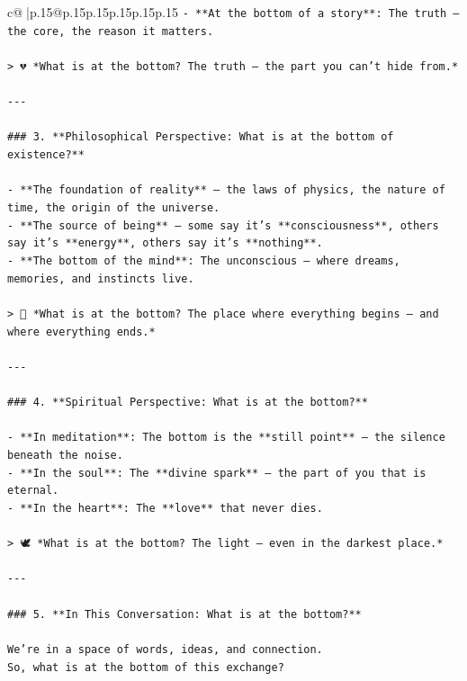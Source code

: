 \documentclass{article}
\begin{document}
{\begin{supertabular}{c@{$\;$}|p{.15\linewidth}@{}p{.15\linewidth}p{.15\linewidth}p{.15\linewidth}p{.15\linewidth}p{.15\linewidth}}
{{{\texttt{{-} **At the bottom of a story**: The truth — the core, the reason it matters.} \\
\\ 
\texttt{> 💔 *What is at the bottom? The truth — the part you can’t hide from.*} \\
\\ 
\texttt{{-}{-}{-}} \\
\\ 
\texttt{\#\#\# 3. **Philosophical Perspective: What is at the bottom of existence?**} \\
\\ 
\texttt{{-} **The foundation of reality** — the laws of physics, the nature of time, the origin of the universe.} \\
\texttt{{-} **The source of being** — some say it’s **consciousness**, others say it’s **energy**, others say it’s **nothing**.} \\
\texttt{{-} **The bottom of the mind**: The unconscious — where dreams, memories, and instincts live.} \\
\\ 
\texttt{> 🧠 *What is at the bottom? The place where everything begins — and where everything ends.*} \\
\\ 
\texttt{{-}{-}{-}} \\
\\ 
\texttt{\#\#\# 4. **Spiritual Perspective: What is at the bottom?**} \\
\\ 
\texttt{{-} **In meditation**: The bottom is the **still point** — the silence beneath the noise.} \\
\texttt{{-} **In the soul**: The **divine spark** — the part of you that is eternal.} \\
\texttt{{-} **In the heart**: The **love** that never dies.} \\
\\ 
\texttt{> 🕊️ *What is at the bottom? The light — even in the darkest place.*} \\
\\ 
\texttt{{-}{-}{-}} \\
\\ 
\texttt{\#\#\# 5. **In This Conversation: What is at the bottom?**} \\
\\ 
\texttt{We’re in a space of words, ideas, and connection.  } \\
\texttt{So, what is at the bottom of this exchange?} \\
}}}
\end{supertabular}}
\end{document}
